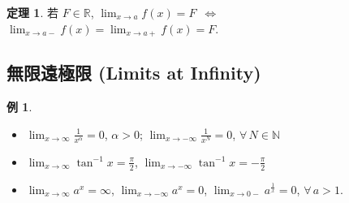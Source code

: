 \documentclass[12pt]{extarticle}
\newcommand{\ds}{\displaystyle}
\newcommand{\ifff}{\,\Longleftrightarrow\,}
\newcommand{\floor}[1]{\lfloor #1 \rfloor}
\theoremstyle{definition}
\newtheorem*{thm}{定理}
\newtheorem*{ex}{例}
\newtheorem*{sol}{解}
\begin{document}
\begin{thm}
  若 $F\in\mathbb{R}$, $\ds\lim_{x\to a}f(x) = F$ $\ifff$ $\ds\lim_{x\to a-} f(x) = \ds\lim_{x\to a+} f(x) = F$. 
\end{thm}

%

\subsection*{無限遠極限 (Limits at Infinity) }
\begin{ex}
  \begin{multicols}{2}
    \begin{itemize}\setlength\itemsep{0em}
      \item $\ds\lim_{x\to\infty}\frac{1}{x^\alpha} = 0$, $\alpha > 0$; $\ds\lim_{x\to-\infty}\frac{1}{x^N} = 0$, $\forall\,N\in\mathbb{N}$
      \item $\ds\lim_{x\to\infty}\tan^{-1} x = \frac{\pi}{2}$, $\ds\lim_{x\to-\infty}\tan^{-1} x = -\frac{\pi}{2}$
      \item $\ds\lim_{x\to\infty}a^x = \infty$, $\ds\lim_{x\to-\infty}a^x = 0$, $\ds\lim_{x\to0-}a^{\frac{1}{x}} = 0$, $\forall\,a > 1$. 
    \end{itemize}
  \end{multicols}
\end{ex}
\end{document}

